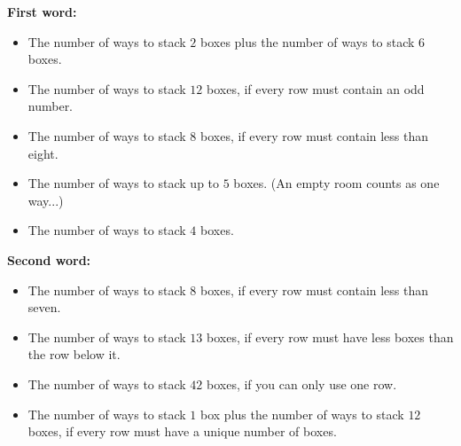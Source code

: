 \begin{multicols}{2}
  \textbf{First word:}
  \begin{itemize}
    \item %
      The number of ways to stack \(2\) boxes plus
      the number of ways to stack \(6\) boxes.
    \item %
      The number of ways to stack \(12\) boxes,
      if every row must contain an odd number.
    \item %
      The number of ways to stack \(8\) boxes,
      if every row must contain less than eight.
    \item %
      The number of ways to stack up to \(5\) boxes.
      (An empty room counts as one way...)
    \item %
      The number of ways to stack \(4\) boxes.
  \end{itemize}
\columnbreak
  \textbf{Second word:}
  \begin{itemize}
    \item %
      The number of ways to stack \(8\) boxes,
      if every row must contain less than seven.
    \item %
      The number of ways to stack \(13\) boxes,
      if every row must have less boxes than the row below it.
    \item %
      The number of ways to stack \(42\) boxes,
      if you can only use one row.
    \item %
      The number of ways to stack \(1\) box plus
      the number of ways to stack \(12\) boxes,
      if every row must have a unique number of boxes.
  \end{itemize}
\end{multicols}





